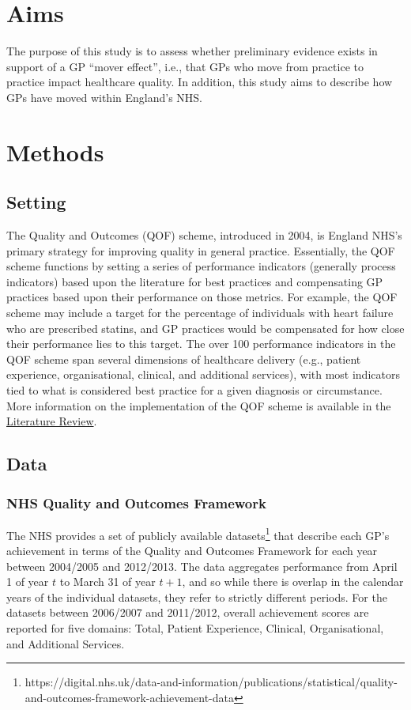 \documentclass[11pt]{article}
\begin{document}
\section{Aims}

The purpose of this study is to assess whether preliminary evidence exists in support of a GP ``mover effect'', i.e., that GPs who move from practice to practice impact healthcare quality. In addition, this study aims to describe how GPs have moved within England's NHS.


\section{Methods}

\subsection{Setting}

The Quality and Outcomes (QOF) scheme, introduced in 2004, is England NHS's primary strategy for improving quality in general practice. Essentially, the QOF scheme functions by setting a series of performance indicators (generally process indicators) based upon the literature for best practices and compensating GP practices based upon their performance on those metrics. For example, the QOF scheme may include a target for the percentage of individuals with heart failure who are prescribed statins, and GP practices would be compensated for how close their performance lies to this target. The over 100 performance indicators in the QOF scheme span several dimensions of healthcare delivery (e.g., patient experience, organisational, clinical, and additional services), with most indicators tied to what is considered best practice for a given diagnosis or circumstance. More information on the implementation of the QOF scheme is available in the \href{https://www.TheodoreCaputi.com/files/qof.pdf}{Literature Review}.


\subsection{Data}

\subsubsection{NHS Quality and Outcomes Framework}
The NHS provides a set of publicly available datasets\footnote{https://digital.nhs.uk/data-and-information/publications/statistical/quality-and-outcomes-framework-achievement-data} that describe each GP's achievement in terms of the Quality and Outcomes Framework for each year between 2004/2005 and 2012/2013. The data aggregates performance from April 1 of year $t$ to March 31 of year $t+1$, and so while there is overlap in the calendar years of the individual datasets, they refer to strictly different periods. For the datasets between 2006/2007 and 2011/2012, overall achievement scores are reported for five domains: Total, Patient Experience, Clinical, Organisational, and Additional Services.
\end{document}
